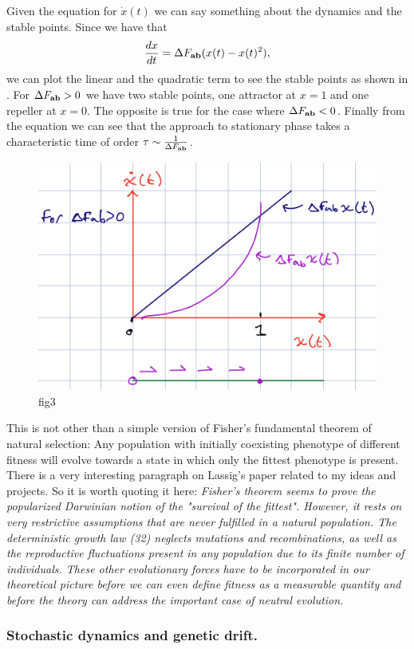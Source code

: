 Given the equation for $\dot{x}(t)$ we can say something about the dynamics and
the stable points. Since we have that
\begin{equation}
  {d{x} \over dt} = \Delta F_{\mathbf{ab}} (x(t) - x(t)^2),
\end{equation}
we can plot the linear and the quadratic term to see the stable points as shown
in . For $\Delta F_{\mathbf{ab}} > 0$ we have two stable points, one
attractor at $x = 1$ and one repeller at $x = 0$. The opposite is true for the
case where $\Delta F_{\mathbf{ab}} < 0$. Finally from the equation we can see that the approach to
stationary phase takes a characteristic time of order $\tau \sim {1 \over \Delta F_{\mathbf{ab}}}$.

\begin{figure}[h!]
	\centering \includegraphics[scale=0.5]{../fig/lassig_2007/phase_portrait.png}
	\caption{fig3}
  \label{fig_phase_portrait}
\end{figure}

This is not other than a simple version of Fisher's fundamental theorem of
natural selection: Any population with initially coexisting phenotype of
different fitness will evolve towards a state in which only the fittest
phenotype is present. There is a very interesting paragraph on Lassig's paper
related to my ideas and projects. So it is worth quoting it here:
{\it Fisher's theorem seems to prove the popularized Darwinian notion of the
"survival of the fittest". However, it rests on very restrictive assumptions
that are never fulfilled in a natural population. The deterministic growth law
(32) neglects mutations and recombinations, as well as the reproductive
fluctuations present in any population due to its finite number of individuals.
These other evolutionary forces have to be incorporated in our theoretical
picture before we can even define fitness as a measurable quantity and before
the theory can address the important case of neutral evolution.}

\subsubsection{Stochastic dynamics and genetic drift.}
